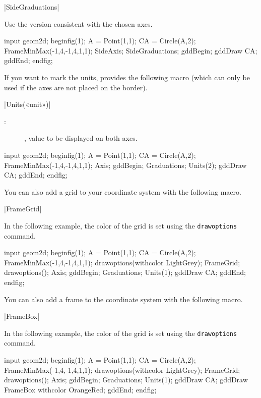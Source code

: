 \documentclass[a4paper,english]{article}
\begin{document}
\begin{colourband}
\macro|SideGraduations|
\end{colourband}

Use the version consistent with the chosen axes.
\begin{ExempleMP}
input geom2d;
beginfig(1);
A = Point(1,1);
CA = Circle(A,2);
FrameMinMax(-1,4,-1,4,1,1);
SideAxis;
SideGraduations;
gddBegin;
gddDraw CA;
gddEnd;
endfig;
\end{ExempleMP}

If you want to mark the units, \mpgeomdd{} provides the following macro (which can only be used if the axes are not placed on the border).
\begin{colourband}
\macro|Units(«unit»)|
\begin{description}
  \item[:] , value to be displayed on both axes.
\end{description}
\end{colourband}
\begin{ExempleMP}
input geom2d;
beginfig(1);
A = Point(1,1);
CA = Circle(A,2);
FrameMinMax(-1,4,-1,4,1,1);
Axis;
gddBegin;
  Graduations;
  Units(2);
  gddDraw CA;
gddEnd;
endfig;
\end{ExempleMP}
You can also add a grid to your coordinate system with the following macro.
\begin{colourband}
\macro|FrameGrid|
\end{colourband}
In the following example, the color of the grid is set using the
 \lstinline+drawoptions+ command.
\begin{ExempleMP}
input geom2d;
beginfig(1);
A = Point(1,1);
CA = Circle(A,2);
FrameMinMax(-1,4,-1,4,1,1);
drawoptions(withcolor LightGrey);
FrameGrid;
drawoptions();
Axis;
gddBegin;
  Graduations;
  Units(1);
  gddDraw CA;
gddEnd;
endfig;
\end{ExempleMP}
You can also add a frame to the coordinate system with the following macro.
\begin{colourband}
  \macro|FrameBox|
\end{colourband}
  In the following example, the color of the grid is set using the
   \lstinline+drawoptions+ command.
  \begin{ExempleMP}
input geom2d;
beginfig(1);
A = Point(1,1);
CA = Circle(A,2);
FrameMinMax(-1,4,-1,4,1,1);
drawoptions(withcolor LightGrey);
FrameGrid;
drawoptions();
Axis;
gddBegin;
  Graduations;
  Units(1);
  gddDraw CA;
  gddDraw FrameBox withcolor OrangeRed;
gddEnd;
endfig;
  \end{ExempleMP}
\end{document}
